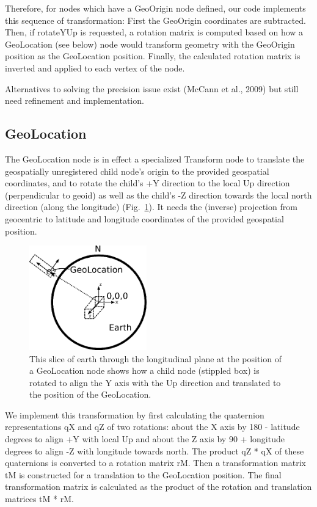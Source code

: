 \documentclass{acmsiggraph}                     %
\begin{document}
Therefore, for nodes which have a GeoOrigin node defined, our code implements this sequence of transformation: First the GeoOrigin coordinates are subtracted. Then, if rotateYUp is requested, a rotation matrix is computed based on how a GeoLocation (see below) node would transform geometry with the GeoOrigin position as the GeoLocation position. Finally, the calculated rotation matrix is inverted and applied to each vertex of the node.

Alternatives to solving the precision issue exist \cite{mccann09} (McCann et al., 2009) but still need refinement and implementation.


\subsection{GeoLocation}

The GeoLocation node is in effect a specialized Transform node to translate the geospatially unregistered child node's origin to the provided geospatial coordinates, and to rotate the child's +Y direction to the local Up direction (perpendicular to geoid) as well as the child's -Z direction towards the local north direction (along the longitude) (Fig.~\ref{fig:GeoLocationDiagram}). It needs the (inverse) projection from geocentric to latitude and longitude coordinates of the provided geospatial position.

\begin{figure}[htbp]
\centering
\includegraphics[width=2.0in]{GeoLocationDiagram.png}
\caption{This slice of earth through the longitudinal plane at the position of a GeoLocation node shows how a child node (stippled box) is rotated to align the Y axis with the Up direction and translated to the position of the GeoLocation.}
\label{fig:GeoLocationDiagram}
\end{figure}

We implement this transformation by first calculating the quaternion representations qX and qZ  of two rotations: about the X axis by 180 - latitude degrees to align +Y with local Up and about the Z axis by 90 + longitude degrees to align -Z with longitude towards north. The product qZ * qX of these quaternions is converted to a rotation matrix rM. Then a transformation matrix tM is constructed for a translation to the GeoLocation position. The final transformation matrix is calculated as the product of the rotation and translation matrices tM * rM.
\end{document}
